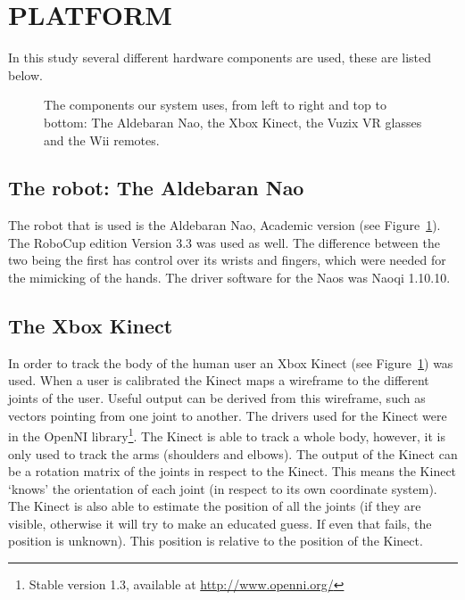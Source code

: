 \documentclass[letterpaper, 10pt, conference]{ieeeconf}
\begin{document}
\section{PLATFORM}
In this study several different hardware components are used, these are listed below. 

\begin{figure}[ht]
\label{Components}
\caption{The components our system uses, from left to right and top to bottom: The Aldebaran Nao, the Xbox Kinect, the Vuzix VR glasses and the Wii remotes.}
\end{figure}
\subsection{The robot: The Aldebaran Nao}
The robot that is used is the Aldebaran Nao, Academic version (see Figure~\ref{Components}). The RoboCup edition Version 3.3 was used as well. 
The difference between the two being the first has control over its wrists and fingers, which were needed for the mimicking of the hands. 
The driver software for the Naos was Naoqi 1.10.10.
\subsection{The Xbox Kinect}
In order to track the body of the human user an Xbox Kinect (see Figure~\ref{Components}) was used. When a user is calibrated the Kinect maps a wireframe to the different joints of the user. Useful output can be derived from this wireframe, such as vectors pointing from one joint to another. The drivers used for the Kinect were in the OpenNI library\footnote{Stable version 1.3, available at \url{http://www.openni.org/}}.
The Kinect is able to track a whole body, however, it is only used to track the arms (shoulders and elbows). The output of the Kinect can be a rotation matrix of the joints in respect to the Kinect. This means the Kinect ‘knows’ the orientation of each joint (in respect to its own coordinate system).
The Kinect is also able to estimate the position of all the joints (if they are visible, otherwise it will try to make an educated guess. If even that fails, the position is unknown). This position is relative to the position of the Kinect.
\end{document}
